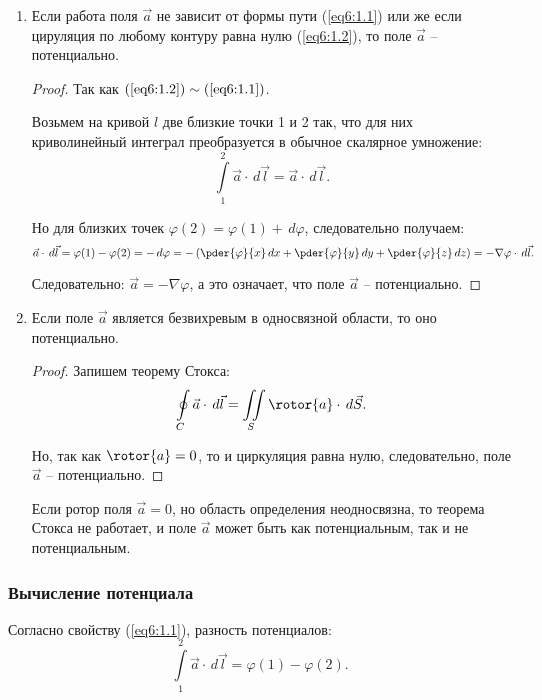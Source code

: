 	\begin{enumerate}
	\item Если работа поля \( \vec{a} \) не зависит от формы пути (\ref{eq6:1.1}) или же если цируляция по любому контуру равна нулю (\ref{eq6:1.2}), то поле \( \vec{a} \) -- потенциально.
	
	\begin{proof}
	
	Так как \( (\ref{eq6:1.2}) \sim (\ref{eq6:1.1}) \).
	
	Возьмем на кривой \( l \) две близкие точки 1 и 2 так, что для них криволинейный интеграл преобразуется в обычное скалярное умножение:
	\[ \int\limits_1^2 \vec{a}\cdot\,d\vec{l} = \vec{a}\cdot\,d\vec{l}. \]
	
	Но для близких точек \( \varphi(2) = \varphi(1) + \,d\varphi \), следовательно получаем:
	\[ \vec{a}\cdot\,d\vec{l} = \varphi(1) - \varphi(2) = -\,d\varphi = -\left(\pder{\varphi}{x}\,d x + \pder{\varphi}{y}\,d y + \pder{\varphi}{z}\,d z \right) = -\nabla\varphi\cdot\,d\vec{l}. \]
	
	Следовательно: \( \vec{a} = -\nabla\varphi \), а это означает, что поле \( \vec{a} \) -- потенциально.
	\end{proof}

	\item Если поле \( \vec{a} \) является безвихревым в односвязной области, то оно потенциально.
	
	\begin{proof}
	
	Запишем теорему Стокса:
	\[ \oint\limits_C \vec{a}\cdot\,d\vec{l} = \iint\limits_S \rotor{a}\cdot\,d\vec{S}. \]
	
	Но, так как \( \rotor{a} = 0 \), то и циркуляция равна нулю, следовательно, поле \( \vec{a} \) -- потенциально.
	\end{proof}
	
	\begin{remark}
	Если ротор поля \( \vec{a} = 0 \), но область определения неодносвязна, то теорема Стокса не работает, и поле \( \vec{a} \) может быть как потенциальным, так и не потенциальным.
	\end{remark}
	\end{enumerate}

\subsubsection{Вычисление потенциала}

	Согласно свойству (\ref{eq6:1.1}), разность потенциалов:
	\[ \int\limits_1^2 \vec{a}\cdot\,d\vec{l} = \varphi(1) - \varphi(2). \]
	
